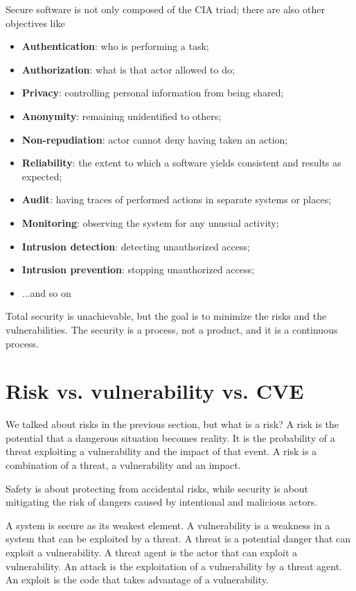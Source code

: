Secure software is not only composed of the CIA triad; there are also other objectives like~\cite{st-slides}
\begin{itemize}
  \item \textbf{Authentication}: who is performing a task;
  \item \textbf{Authorization}: what is that actor allowed to do;
  \item \textbf{Privacy}: controlling personal information from being shared;
  \item \textbf{Anonymity}: remaining unidentified to others;
  \item \textbf{Non-repudiation}: actor cannot deny having taken an action;
  \item \textbf{Reliability}: the extent to which a software yields consistent and results as expected;
  \item \textbf{Audit}: having traces of performed actions in separate systems or places;
  \item \textbf{Monitoring}: observing the system for any unusual activity;
  \item \textbf{Intrusion detection}: detecting unauthorized access;
  \item \textbf{Intrusion prevention}: stopping unauthorized access;
  \item ...and so on
\end{itemize}

Total security is unachievable, but the goal is to minimize the risks and the vulnerabilities. The security is a process, not a product, and it is a continuous process.~\cite{st-slides}

\section{Risk vs. vulnerability vs. CVE}

We talked about risks in the previous section, but what is a risk? A risk is the potential that a dangerous situation becomes reality. It is the probability of a threat exploiting a vulnerability and the impact of that event. A risk is a combination of a threat, a vulnerability and an impact.

Safety is about protecting from accidental risks, while security is about mitigating the risk of dangers caused by intentional and malicious actors.

A system is secure as its weakest element. A vulnerability is a weakness in a system that can be exploited by a threat. A threat is a potential danger that can exploit a vulnerability. A threat agent is the actor that can exploit a vulnerability. An attack is the exploitation of a vulnerability by a threat agent. An exploit is the code that takes advantage of a vulnerability.

